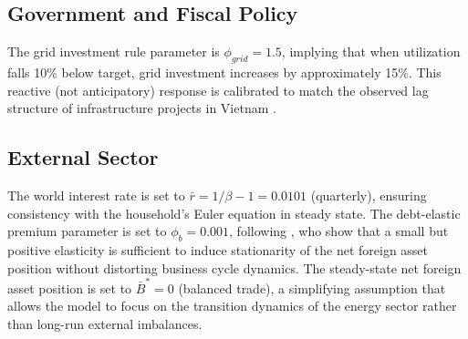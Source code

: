 \documentclass[12pt, a4paper]{article}
\begin{document}
\subsection{Government and Fiscal Policy}

The grid investment rule parameter is $\phi_{grid} = 1.5$, implying that when utilization falls 10\% below target, grid investment increases by approximately 15\%. This reactive (not anticipatory) response is calibrated to match the observed lag structure of infrastructure projects in Vietnam \citep{worldbank2022}.

\subsection{External Sector}

The world interest rate is set to $\bar{r} = 1/\beta - 1 = 0.0101$ (quarterly), ensuring consistency with the household's Euler equation in steady state. The debt-elastic premium parameter is set to $\phi_b = 0.001$, following \citet{schmittgrohe2003}, who show that a small but positive elasticity is sufficient to induce stationarity of the net foreign asset position without distorting business cycle dynamics. The steady-state net foreign asset position is set to $\bar{B}^* = 0$ (balanced trade), a simplifying assumption that allows the model to focus on the transition dynamics of the energy sector rather than long-run external imbalances.
\end{document}
